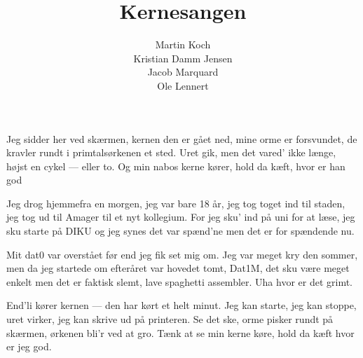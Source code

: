 \documentclass{article}
\title{Kernesangen}
\author{Martin Koch \\ Kristian Damm Jensen \\ Jacob
  Marquard \\ Ole Lennert}
\begin{document}
\begin{song}
 Jeg sidder her ved skærmen,
          kernen den er gået ned,
          mine orme er forsvundet,
          de kravler rundt i primtalsørkenen et sted.
          Uret gik, men det vared' ikke længe,
          højst en cykel --- eller to.
          Og min nabos kerne kører,
          hold da kæft, hvor er han god

 Jeg drog hjemmefra en morgen,
          jeg var bare 18 år,
          jeg tog toget ind til staden,
          jeg tog ud til Amager til et nyt kollegium.
          For jeg sku' ind på uni for at læse,
          jeg sku starte på DIKU
          og jeg synes det var spænd'ne
          men det er for spændende nu.

\pagebreak[4]

 Mit dat0 var overstået
          før end jeg fik set mig om. 
          Jeg var meget kry den sommer,
          men da jeg startede om efteråret var hovedet tomt,
          Dat1M, det sku være meget enkelt
          men det er faktisk slemt,
          lave spaghetti assembler.
          Uha hvor er det grimt.

 End'li kører kernen ---
          den har kørt et helt minut.
          Jeg kan starte, jeg kan stoppe,
          uret virker, jeg kan skrive ud på printeren.
          Se det ske, orme pisker rundt på skærmen,
          ørkenen bli'r ved at gro.
          Tænk at se min kerne køre, 
          hold da kæft hvor er jeg god.

\end{song}
\end{document}
